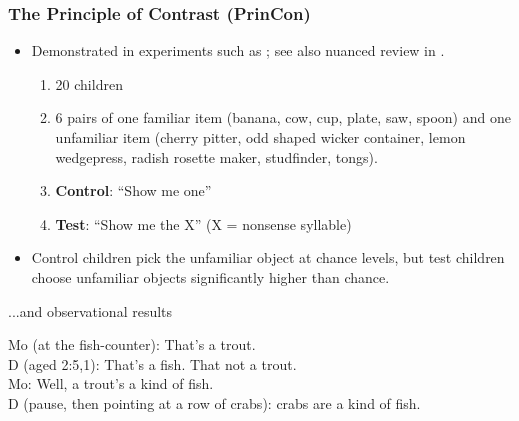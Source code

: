 \documentclass[hyperref={pdfpagelabels=false}]{beamer}
\begin{document}
\begin{frame}
\frametitle{The Principle of Contrast (PrinCon)}
\begin{itemize}
	\item Demonstrated in experiments such as \citet{markmanwachtel1988, bionetal2013}; see also nuanced review in \citet{bionetal2013}.
		\begin{enumerate}
			\item 20 children
			\item 6 pairs of one familiar item (banana, cow, cup, plate, saw, spoon) and one unfamiliar item (cherry pitter, odd shaped wicker container, lemon wedgepress, radish rosette maker, studfinder, tongs).
			\item \textbf{Control}: ``Show me one''
			\item \textbf{Test}: ``Show me the X'' (X = nonsense syllable)
		\end{enumerate}
	\item Control children pick the unfamiliar object at chance levels, but test children choose unfamiliar objects significantly higher than chance.
\end{itemize}
\end{frame}



\begin{frame}{...and observational results}
		\begin{exe}
			\ex Mo (at the fish-counter): That's a trout.\\
			 D (aged 2:5,1): That's a fish. That not a trout.\\
			 Mo: Well, a trout's a kind of fish.\\
			 D (pause, then pointing at a row of crabs): crabs are a kind of fish.\\
			 \citet[][97]{clark1995}
		\end{exe}
		
		
		
\end{frame}
\end{document}
